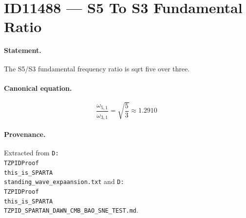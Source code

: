 \section*{ID11488 --- S5 To S3 Fundamental Ratio}

\paragraph{Statement.}
The S5/S3 fundamental frequency ratio is sqrt five over three.

\paragraph{Canonical equation.}
\[
\frac{\omega_{5,1}}{\omega_{3,1}}=\sqrt{\frac{5}{3}}\approx1.2910
\]

\paragraph{Provenance.}
Extracted from \texttt{D:\\TZPIDProof\\this\_is\_SPARTA\\standing\_wave\_expaansion.txt} and \texttt{D:\\TZPIDProof\\this\_is\_SPARTA\\TZPID\_SPARTAN\_DAWN\_CMB\_BAO\_SNE\_TEST.md}.
